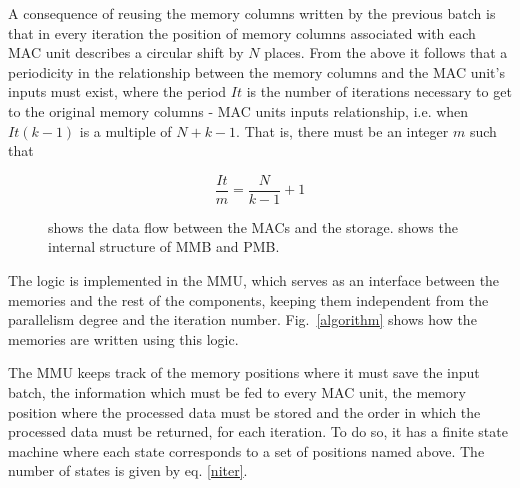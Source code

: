 \documentclass[conference,compsoc]{IEEEtran}
\begin{document}
A consequence of reusing the memory columns written by the previous batch is
that in every iteration the position of memory columns associated with each
MAC unit describes a circular shift by $N$ places. From the above it
follows that a periodicity in the relationship between the memory columns and the
MAC unit's inputs must exist, where the period $It$ is the number of
iterations necessary to get to the original memory columns - MAC units
inputs relationship, i.e. when $It(k-1)$ is a multiple of $N+k-1$. That is, there
must be an integer $m$ such that 

\begin{equation}\label{niter}
  \frac{It}{m} = \frac{N}{k-1} + 1
\end{equation}

\begin{figure}[!t]
\centering
{}
\hfil
\centering
{}
\caption{\protect{} shows the data flow between the MACs and the
  storage. \protect{} shows the internal structure of MMB and PMB.}
\label{muxes}
\end{figure}

The logic is implemented in the MMU, which serves as an interface between
the memories and the rest of the components, keeping them independent from the
parallelism degree and the iteration number. Fig.~\ref{algorithm} shows how
the memories are written using this logic. 

The MMU keeps track of the memory
positions where it must save the input batch, the information which must be fed
to every MAC unit, the memory position where the processed data must be
stored and the order in which the processed data must be returned, for each iteration.
To do so, it has a finite state machine where each state corresponds to a set of
positions named above. The number of states is given by eq. \ref{niter}.
\end{document}
